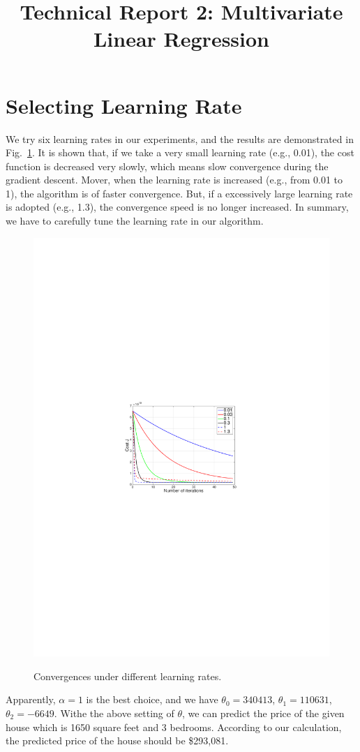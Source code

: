 \documentclass[10pt,a4paper]{article}
\date{}
\begin{document}
\title{Technical Report 2: Multivariate Linear Regression}

\maketitle

\section{Selecting Learning Rate}
%
  We try six learning rates in our experiments, and the results are demonstrated in Fig.~\ref{fig:con}. It is shown that, if we take a very small learning rate (e.g., 0.01), the cost function is decreased very slowly, which means slow convergence during the gradient descent. Mover, when the learning rate is increased (e.g., from 0.01 to 1), the algorithm is of faster convergence. But, if a excessively large learning rate is adopted (e.g., 1.3), the convergence speed is no longer increased. In summary, we have to carefully tune the learning rate in our algorithm.
  \begin{figure}[htb!]
  \centering
    \includegraphics[width=.6\columnwidth]{convergence} \\ %
  \caption{Convergences under different learning rates.}
  \label{fig:con}
  \end{figure}

  Apparently, $\alpha=1$ is the best choice, and we have $\theta_0=340413$, $\theta_1=110631$, $\theta_2=-6649$. Withe the above setting of $\theta$, we can predict the price of the given house which is 1650 square feet and 3 bedrooms. According to our calculation, the predicted price of the house should be \$293,081.
\end{document}

